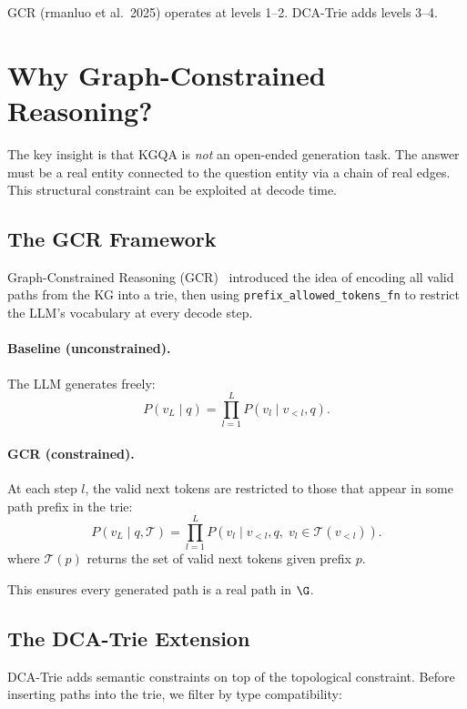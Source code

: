 \documentclass[11pt,a4paper]{article}
\begin{document}
GCR (rmanluo et al.\ 2025) operates at levels 1--2.  DCA-Trie adds
levels 3--4.

\section{Why Graph-Constrained Reasoning?}

The key insight is that KGQA is \emph{not} an open-ended generation
task.  The answer must be a real entity connected to the question entity
via a chain of real edges.  This structural constraint can be exploited
at decode time.

\subsection{The GCR Framework}

Graph-Constrained Reasoning (GCR)~\cite{gcr2025} introduced the idea of
encoding all valid paths from the KG into a trie, then using
\texttt{prefix\_allowed\_tokens\_fn} to restrict the LLM's vocabulary
at every decode step.

\paragraph{Baseline (unconstrained).}  The LLM generates freely:
\[
  P(v_L \mid q) = \prod_{l=1}^{L} P(v_l \mid v_{<l}, q).
\]

\paragraph{GCR (constrained).}  At each step $l$, the valid next tokens
are restricted to those that appear in some path prefix in the trie:
\[
  P(v_L \mid q, \mathcal{T}) = \prod_{l=1}^{L}
  P(v_l \mid v_{<l}, q,\; v_l \in \mathcal{T}(v_{<l})).
\]
where $\mathcal{T}(p)$ returns the set of valid next tokens given prefix
$p$.

This ensures every generated path is a real path in $\G$.

\subsection{The DCA-Trie Extension}

DCA-Trie adds semantic constraints on top of the topological constraint.
Before inserting paths into the trie, we filter by type compatibility:
\end{document}
